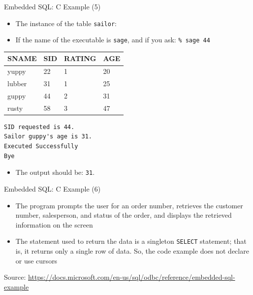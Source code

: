 \documentclass[aspectratio=169, xcolor=dvipsnames]{beamer}
\begin{document}
\begin{frame}[fragile]{Embedded SQL: C Example (5)}
    \begin{itemize}
        \item The instance of the table \texttt{sailor}:
        \item If the name of the executable is \texttt{sage}, and if you ask: \texttt{\% sage 44}
    \end{itemize}
    \centering
    \begin{tabular}{llll}
    \toprule
    \textbf{SNAME} & \textbf{SID} & \textbf{RATING} & \textbf{AGE} \\
    \midrule
    yuppy & 22 & 1 & 20 \\
    lubber & 31 & 1 & 25 \\
    guppy & 44 & 2 & 31 \\
    rusty & 58 & 3 & 47 \\
    \bottomrule
    \end{tabular}
    \begin{verbatim}
SID requested is 44.
Sailor guppy's age is 31.
Executed Successfully
Bye
    \end{verbatim}
    \begin{itemize}
        \item The output should be: \texttt{31}.
    \end{itemize}
\end{frame}

\begin{frame}[fragile]{Embedded SQL: C Example (6)}
    \begin{itemize}
        \item The program prompts the user for an order number, retrieves the customer number, salesperson, and status of the order, and displays the retrieved information on the screen
    \end{itemize}
    \begin{center}
    \end{center}
    \begin{itemize}
        \item The statement used to return the data is a singleton \texttt{SELECT} statement; that is, it returns only a single row of data. So, the code example does not declare or use cursors
    \end{itemize}
    \small Source: \url{https://docs.microsoft.com/en-us/sql/odbc/reference/embedded-sql-example}
\end{frame}
\end{document}
